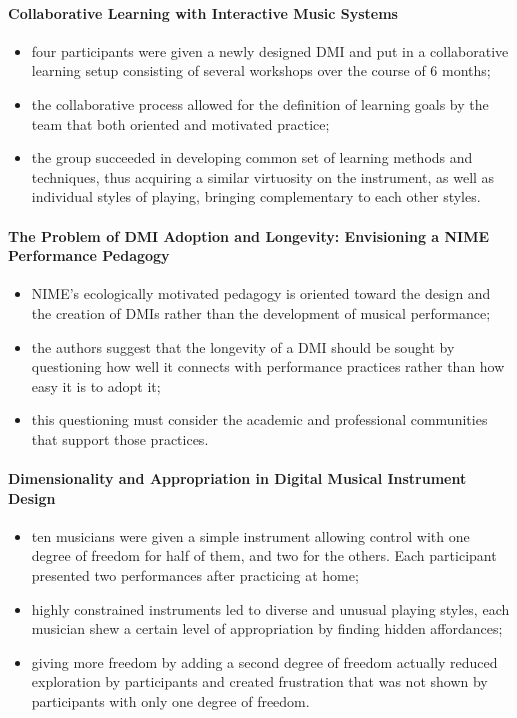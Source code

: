 \documentclass[11pt]{article}
\begin{document}
\paragraph{Collaborative Learning with Interactive Music Systems} \citep{marquez-borbon_collaborative_2020}
\begin{itemize}
    \item four participants were given a newly designed DMI and put in a collaborative learning setup consisting of several workshops over the course of 6 months;
    \item the collaborative process allowed for the definition of learning goals by the team that both oriented and motivated practice;
    \item the group succeeded in developing common set of learning methods and techniques, thus acquiring a similar virtuosity on the instrument, as well as individual styles of playing, bringing complementary to each other styles.
\end{itemize}


\paragraph{The Problem of DMI Adoption and Longevity: Envisioning a NIME Performance Pedagogy} \citep{marquez-borbon_problem_2018}
\begin{itemize}
    \item NIME's ecologically motivated pedagogy is oriented toward the design and the creation of DMIs rather than the development of musical performance;
    \item the authors suggest that the longevity of a DMI should be sought by questioning how well it connects with performance practices rather than how easy it is to adopt it;
    \item this questioning must consider the academic and professional communities that support those practices.
\end{itemize}

\paragraph{Dimensionality and Appropriation in Digital Musical Instrument Design} \citep{zappi_dimensionality_2014}
\begin{itemize}
    \item ten musicians were given a simple instrument allowing control with one degree of freedom for half of them, and two for the others. Each participant presented two performances after practicing at home;
    \item highly constrained instruments led to diverse and unusual playing styles, each musician shew a certain level of appropriation by finding hidden affordances;
    \item giving more freedom by adding a second degree of freedom actually reduced exploration by participants and created frustration that was not shown by participants with only one degree of freedom.
\end{itemize}
\end{document}
